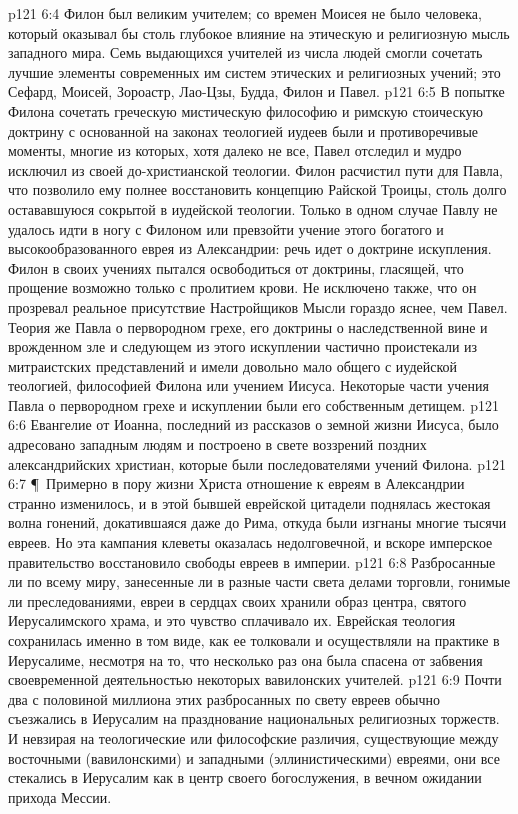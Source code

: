 \vs p121 6:4 Филон был великим учителем; со времен Моисея не было человека, который оказывал бы столь глубокое влияние на этическую и религиозную мысль западного мира. Семь выдающихся учителей из числа людей смогли сочетать лучшие элементы современных им систем этических и религиозных учений; это Сефард, Моисей, Зороастр, Лао\hyp{}Цзы, Будда, Филон и Павел.
\vs p121 6:5 В попытке Филона сочетать греческую мистическую философию и римскую стоическую доктрину с основанной на законах теологией иудеев были и противоречивые моменты, многие из которых, хотя далеко не все, Павел отследил и мудро исключил из своей до\hyp{}христианской теологии. Филон расчистил пути для Павла, что позволило ему полнее восстановить концепцию Райской Троицы, столь долго остававшуюся сокрытой в иудейской теологии. Только в одном случае Павлу не удалось идти в ногу с Филоном или превзойти учение этого богатого и высокообразованного еврея из Александрии: речь идет о доктрине искупления. Филон в своих учениях пытался освободиться от доктрины, гласящей, что прощение возможно только с пролитием крови. Не исключено также, что он прозревал реальное присутствие Настройщиков Мысли гораздо яснее, чем Павел. Теория же Павла о первородном грехе, его доктрины о наследственной вине и врожденном зле и следующем из этого искуплении частично проистекали из митраистских представлений и имели довольно мало общего с иудейской теологией, философией Филона или учением Иисуса. Некоторые части учения Павла о первородном грехе и искуплении были его собственным детищем.
\vs p121 6:6 Евангелие от Иоанна, последний из рассказов о земной жизни Иисуса, было адресовано западным людям и построено в свете воззрений поздних александрийских христиан, которые были последователями учений Филона.
\vs p121 6:7 \P\ Примерно в пору жизни Христа отношение к евреям в Александрии странно изменилось, и в этой бывшей еврейской цитадели поднялась жестокая волна гонений, докатившаяся даже до Рима, откуда были изгнаны многие тысячи евреев. Но эта кампания клеветы оказалась недолговечной, и вскоре имперское правительство восстановило свободы евреев в империи.
\vs p121 6:8 Разбросанные ли по всему миру, занесенные ли в разные части света делами торговли, гонимые ли преследованиями, евреи в сердцах своих хранили образ центра, святого Иерусалимского храма, и это чувство сплачивало их. Еврейская теология сохранилась именно в том виде, как ее толковали и осуществляли на практике в Иерусалиме, несмотря на то, что несколько раз она была спасена от забвения своевременной деятельностью некоторых вавилонских учителей.
\vs p121 6:9 Почти два с половиной миллиона этих разбросанных по свету евреев обычно съезжались в Иерусалим на празднование национальных религиозных торжеств. И невзирая на теологические или философские различия, существующие между восточными (вавилонскими) и западными (эллинистическими) евреями, они все стекались в Иерусалим как в центр своего богослужения, в вечном ожидании прихода Мессии.
